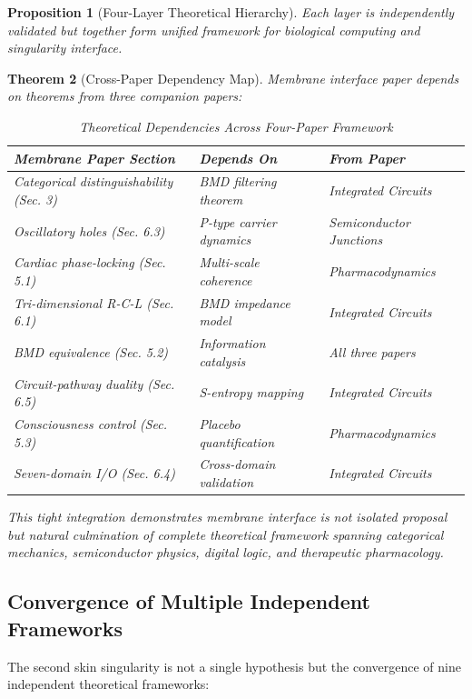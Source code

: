 \documentclass[11pt,a4paper]{article}
\newtheorem{theorem}{Theorem}[section]
\newtheorem{proposition}[theorem]{Proposition}
\theoremstyle{definition}
\theoremstyle{remark}
\begin{document}
\begin{proposition}[Four-Layer Theoretical Hierarchy]
Each layer is independently validated but together form unified framework for biological computing and singularity interface.
\end{proposition}

\begin{theorem}[Cross-Paper Dependency Map]
Membrane interface paper depends on theorems from three companion papers:

\begin{table}[H]
\centering
\caption{Theoretical Dependencies Across Four-Paper Framework}
\begin{tabular}{p{}|p{}|p{}}
\toprule
\textbf{Membrane Paper Section} & \textbf{Depends On} & \textbf{From Paper} \\
\midrule
Categorical distinguishability (Sec. 3) & BMD filtering theorem & Integrated Circuits \\
\midrule
Oscillatory holes (Sec. 6.3) & P-type carrier dynamics & Semiconductor Junctions \\
\midrule
Cardiac phase-locking (Sec. 5.1) & Multi-scale coherence & Pharmacodynamics \\
\midrule
Tri-dimensional R-C-L (Sec. 6.1) & BMD impedance model & Integrated Circuits \\
\midrule
BMD equivalence (Sec. 5.2) & Information catalysis & All three papers \\
\midrule
Circuit-pathway duality (Sec. 6.5) & S-entropy mapping & Integrated Circuits \\
\midrule
Consciousness control (Sec. 5.3) & Placebo quantification & Pharmacodynamics \\
\midrule
Seven-domain I/O (Sec. 6.4) & Cross-domain validation & Integrated Circuits \\
\bottomrule
\end{tabular}
\end{table}

This tight integration demonstrates membrane interface is not isolated proposal but natural culmination of complete theoretical framework spanning categorical mechanics, semiconductor physics, digital logic, and therapeutic pharmacology.
\end{theorem}


\subsection{Convergence of Multiple Independent Frameworks}

The second skin singularity is not a single hypothesis but the convergence of nine independent theoretical frameworks:
\end{document}
